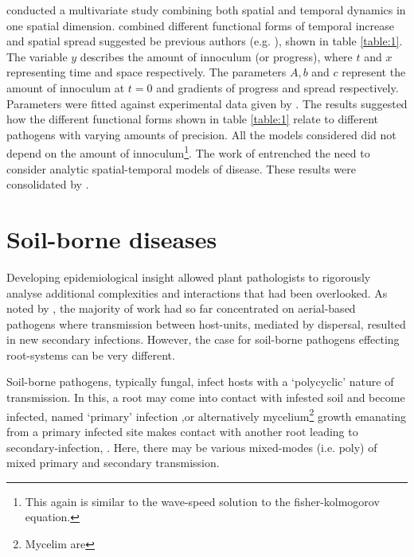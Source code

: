 \cite{jeger1983analysing} conducted a multivariate study combining both spatial and temporal dynamics in one spatial dimension. \cite{jeger1983analysing} combined different functional forms of temporal increase and spatial spread suggested be previous authors (e.g. \cite{van2013plant, doi:10.1146/annurev.py.06.090168.001201}), shown in table \ref{table:1}. The variable $y$ describes the amount of innoculum (or progress), where $t$ and $x$ representing time and space respectively. The parameters  $A, b$ and $c$ represent the amount of innoculum at $t=0$ and gradients of progress and spread respectively. Parameters were fitted against experimental data given by \cite{berger1979spatial}. The results suggested how the different functional forms shown in table \ref{table:1} relate to different pathogens with varying amounts of precision. All the models considered did not depend on the amount of innoculum\footnote{This again is similar to the wave-speed solution to the fisher-kolmogorov equation.}. The work of \cite{jeger1983analysing} entrenched the need to consider analytic spatial-temporal models of disease. These results were consolidated by \cite{campbell1990introduction}.

\section{Soil-borne diseases}
Developing epidemiological insight allowed plant pathologists to rigorously analyse additional complexities and interactions that had been overlooked. As noted by \cite{doi:10.1146/annurev.py.21.090183.000401}, the majority of work had so far concentrated on aerial-based pathogens where transmission between host-units, mediated by dispersal, resulted in new secondary infections. However, the case for soil-borne pathogens effecting root-systems can be very different. 

Soil-borne pathogens, typically fungal, infect hosts with a `polycyclic' nature of transmission. In this, a root may come into contact with infested soil and become infected, named `primary' infection ,or alternatively mycelium\footnote{Mycelim are} growth emanating from a primary infected site makes contact with another root leading to secondary-infection, \cite{crowe1980vertical}. Here, there may be various mixed-modes (i.e. poly) of mixed primary and secondary transmission. 

